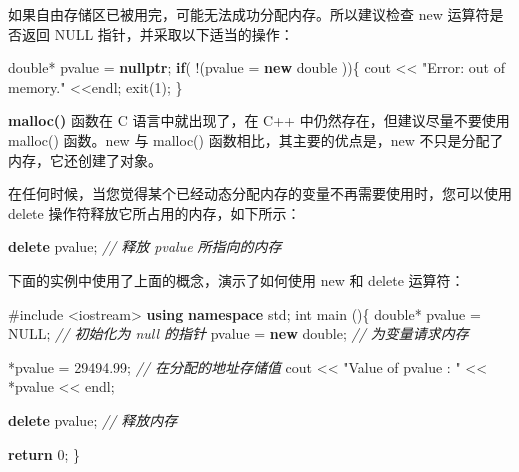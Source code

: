 \documentclass[
]{article}
\newenvironment{Shaded}{}{}
\newcommand{\CommentTok}[1]{\textcolor[rgb]{0.38,0.63,0.69}{\textit{#1}}}
\newcommand{\ControlFlowTok}[1]{\textcolor[rgb]{0.00,0.44,0.13}{\textbf{#1}}}
\newcommand{\DataTypeTok}[1]{\textcolor[rgb]{0.56,0.13,0.00}{#1}}
\newcommand{\DecValTok}[1]{\textcolor[rgb]{0.25,0.63,0.44}{#1}}
\newcommand{\FloatTok}[1]{\textcolor[rgb]{0.25,0.63,0.44}{#1}}
\newcommand{\ImportTok}[1]{#1}
\newcommand{\KeywordTok}[1]{\textcolor[rgb]{0.00,0.44,0.13}{\textbf{#1}}}
\newcommand{\NormalTok}[1]{#1}
\newcommand{\OperatorTok}[1]{\textcolor[rgb]{0.40,0.40,0.40}{#1}}
\newcommand{\PreprocessorTok}[1]{\textcolor[rgb]{0.74,0.48,0.00}{#1}}
\newcommand{\StringTok}[1]{\textcolor[rgb]{0.25,0.44,0.63}{#1}}
\begin{document}
如果自由存储区已被用完，可能无法成功分配内存。所以建议检查 new
运算符是否返回 NULL 指针，并采取以下适当的操作：

\begin{Shaded}
\begin{Highlighting}[]
\DataTypeTok{double}\OperatorTok{*}\NormalTok{ pvalue  }\OperatorTok{=} \KeywordTok{nullptr}\OperatorTok{;}
\ControlFlowTok{if}\OperatorTok{(} \OperatorTok{!(}\NormalTok{pvalue  }\OperatorTok{=} \KeywordTok{new} \DataTypeTok{double} \OperatorTok{))\{}
\NormalTok{   cout }\OperatorTok{\textless{}\textless{}} \StringTok{"Error: out of memory."} \OperatorTok{\textless{}\textless{}}\NormalTok{endl}\OperatorTok{;}
\NormalTok{   exit}\OperatorTok{(}\DecValTok{1}\OperatorTok{);}
\OperatorTok{\}}
\end{Highlighting}
\end{Shaded}

\textbf{malloc()} 函数在 C 语言中就出现了，在 C++
中仍然存在，但建议尽量不要使用 malloc() 函数。new 与 malloc()
函数相比，其主要的优点是，new 不只是分配了内存，它还创建了对象。

在任何时候，当您觉得某个已经动态分配内存的变量不再需要使用时，您可以使用
delete 操作符释放它所占用的内存，如下所示：

\begin{Shaded}
\begin{Highlighting}[]
\KeywordTok{delete}\NormalTok{ pvalue}\OperatorTok{;}        \CommentTok{// 释放 pvalue 所指向的内存}
\end{Highlighting}
\end{Shaded}

下面的实例中使用了上面的概念，演示了如何使用 new 和 delete 运算符：

\begin{Shaded}
\begin{Highlighting}[]
\PreprocessorTok{\#include }\ImportTok{\textless{}iostream\textgreater{}}
\KeywordTok{using} \KeywordTok{namespace}\NormalTok{ std}\OperatorTok{;}
\DataTypeTok{int}\NormalTok{ main }\OperatorTok{()\{}
   \DataTypeTok{double}\OperatorTok{*}\NormalTok{ pvalue  }\OperatorTok{=}\NormalTok{ NULL}\OperatorTok{;} \CommentTok{// 初始化为 null 的指针}
\NormalTok{   pvalue  }\OperatorTok{=} \KeywordTok{new} \DataTypeTok{double}\OperatorTok{;}   \CommentTok{// 为变量请求内存}
 
   \OperatorTok{*}\NormalTok{pvalue }\OperatorTok{=} \FloatTok{29494.99}\OperatorTok{;}     \CommentTok{// 在分配的地址存储值}
\NormalTok{   cout }\OperatorTok{\textless{}\textless{}} \StringTok{"Value of pvalue : "} \OperatorTok{\textless{}\textless{}} \OperatorTok{*}\NormalTok{pvalue }\OperatorTok{\textless{}\textless{}}\NormalTok{ endl}\OperatorTok{;}

   \KeywordTok{delete}\NormalTok{ pvalue}\OperatorTok{;}         \CommentTok{// 释放内存}

   \ControlFlowTok{return} \DecValTok{0}\OperatorTok{;}
\OperatorTok{\}}
\end{Highlighting}
\end{Shaded}
\end{document}
